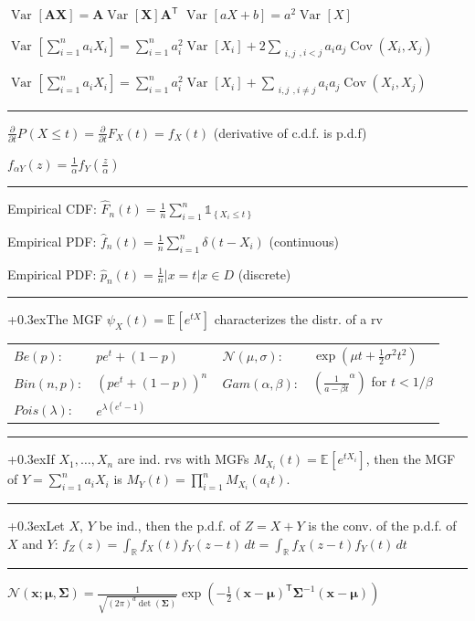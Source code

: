 \documentclass[a2paper,8pt]{extarticle}
\newcommand{\R}{\mathbb{R}}
\newcommand{\cN}{\mathcal{N}}
\newcommand{\set}[1]{\left\{ #1 \right\}}
\newcommand{\card}[1]{\left\lvert #1 \right\rvert}
\newcommand{\Prob}[2][]{P_{#1}\left( #2 \right)}
\newcommand{\Var}[2][]{\operatorname{Var}_{#1}\left[ #2 \right]}
\newcommand{\Exp}[2][]{{\mathbb{E}_{#1}}\left[ #2
\right]}
\newcommand{\Cov}[1]{\operatorname{Cov}\left(#1 \right)}
\newcommand{\ind}[1]{\mathds{1}_{\set{#1}}}
\newcommand{\rX}{X}
\newcommand{\rY}{Y}
\newcommand*{\T}{\mathsf{T}}
\newcommand{\mat}[1]{\mathbf{#1}}
\renewcommand{\vec}[1]{\mathbf{#1}}
\newcommand{\vx}{\vec{x}}
\newcommand{\vmu}{\boldsymbol{\mu}}
\newcommand{\MA}{\mat{A}}
\newcommand{\MX}{\mat{X}}
\newcommand{\MSigma}{\mat{\Sigma}}
\newcommand{\customboxpaddingsize}{0pt}
\newcommand{\emptyarg}[1][]{\ifthenelse{\isempty{#1}}{}{\ (#1)}}
\newcommand{\Thm}[1][]{{\setlength\fboxsep{\customboxpaddingsize}
\colorbox{thmcolor}{%
\color{custtitlecolor}{\textbf{T.\emptyarg[#1]}}}\kern+0.3ex}}
\newcommand{\sep}{\vspace{0pt}\noindent\hrule\vspace{0pt}}
\newcommand{\sep}{\vspace{5pt}\noindent\hrule\vspace{5pt}}
\begin{document}
\begin{landscape}
\begin{multicols*}{7}
$
\Var{\MA\MX}=\MA\Var{\MX}\MA^\T
$
\quad
$\Var{aX+b}=a^2\Var{X}$

$
\textstyle{
\Var{\sum_{i=1}^n a_iX_i}
=
\sum_{i=1}^n a_i^2\Var{X_i}
+
2\sum_{\substack{i,j},i<j}a_ia_j\Cov{X_i,X_j}
}
$

$
\textstyle{
\Var{\sum_{i=1}^n a_iX_i}
=
\sum_{i=1}^n a_i^2\Var{X_i}
+
\sum_{\substack{i,j},i\neq j}a_ia_j\Cov{X_i,X_j}
}
$

\sep

$
\frac{\partial}{\partial t} \Prob{X\leq t}
=
\frac{\partial}{\partial t} F_X(t)
=
f_X(t)
$
(derivative of c.d.f. is p.d.f)

$
f_{\alpha Y}(z)
=
\frac{1}{\alpha}f_Y(\frac{z}{\alpha})
$

\sep

Empirical CDF: $\hat{F}_n(t)=\frac{1}{n}\sum_{i=1}^n \ind{X_i\leq t}$

Empirical PDF: $\hat{f}_n(t)=\frac{1}{n}\sum_{i=1}^n\delta(t-X_i)$ (continuous)

Empirical PDF: $\hat{p}_n(t)=\frac{1}{n}\card{x=t}{x\in D}$ (discrete)

\sep

\Thm The MGF $\psi_{X}(t)=\Exp{e^{tX}}$ characterizes the distr. of a
rv

\begin{tabular}{@{}l@{}l|l@{}l@{}}
$Be(p)$: & $pe^t+(1-p)$
&
$\cN(\mu,\sigma)$: & $\exp\left(\mu t + \frac{1}{2}\sigma^2 t^2\right)$
\\
$Bin(n,p)$:\, & $(pe^t + (1-p))^n$\,
&
$Gam(\alpha,\beta)$:\, & $\left(\frac{1}{a-\beta t}^\alpha\right)$ for
$t<1/\beta$
\\
$Pois(\lambda)$: & $e^{\lambda(e^t -1)}$
\\
\end{tabular}

\sep

\Thm If $\rX_1,\ldots,\rX_n$ are ind. rvs with 
MGFs $M_{\rX_i}(t)=\Exp{e^{t\rX_i}}$, then the
MGF of $\rY=\sum_{i=1}^n a_i\rX_i$
is $M_{\rY}(t)=\prod_{i=1}^n M_{X_i}(a_it)$.

\sep

\Thm Let $X$, $Y$ be ind., then the p.d.f. of $Z=X+Y$ is the conv.
of the p.d.f. of $X$ and $Y$: $
f_Z(z) = \int_{\R} f_X(t)f_Y(z-t) \,dt
= \int_{\R} f_X(z-t)f_Y(t) \,dt
$

\sep

$
\cN(\vx;\vmu,\MSigma)
=
\frac{1}{\sqrt{(2\pi)^d\det(\MSigma)}}
\exp\left(-\frac{1}{2}(\vx-\vmu)^\T\MSigma^{-1}
(\vx-\vmu)\right)
$



\end{multicols*}
\end{landscape}
\end{document}
